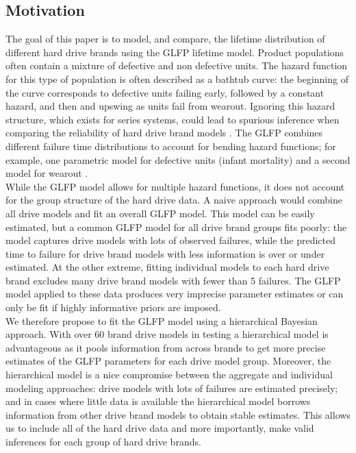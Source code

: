\documentclass[12pt]{article}
\begin{document}
\subsection{Motivation}
The goal of this paper is to model, and compare, the lifetime distribution of different hard drive brands using the GLFP lifetime model.  Product populations often contain a mixture of defective and non defective units.  The hazard function for this type of population is often described as a bathtub curve: the beginning of the curve corresponds to defective units failing early, followed by a constant hazard, and then and upswing as units fail from wearout.  Ignoring this hazard structure, which exists for series systems, could lead to spurious inference when comparing the reliability of hard drive brand models \cite{sujata}.  The GLFP combines different failure time distributions to account for bending hazard functions; for example, one parametric model for defective units (infant mortality) and a second model for wearout \cite{chan}. \\ 

While the GLFP model allows for multiple hazard functions, it does not account for the group structure of the hard drive data.  A naive approach would combine all drive models and fit an overall GLFP model.  This model can be easily estimated, but a common GLFP model for all drive brand groups fits poorly: the model captures drive models with lots of observed failures, while the predicted time to failure for drive brand models with less information is over or under estimated.  At the other extreme, fitting individual models to each hard drive brand excludes many drive brand models with fewer than 5 failures.  The GLFP model applied to these data produces very imprecise parameter estimates or can only be fit if highly informative priors are imposed.  \\

We therefore propose to fit the GLFP model using a hierarchical Bayesian approach.  With over 60 brand drive models in testing a hierarchical model is advantageous as it pools information from across brands to get more precise estimates of the GLFP parameters for each drive model group.  Moreover, the hierarchical model is a nice compromise between the aggregate and individual modeling approaches: drive models with lots of failures are estimated precisely; and in cases where little data is available the hierarchical model borrows information from other drive brand models to obtain stable estimates.  This allows us to include all of the hard drive data and more importantly, make valid inferences for each group of hard drive brands.
\end{document}
